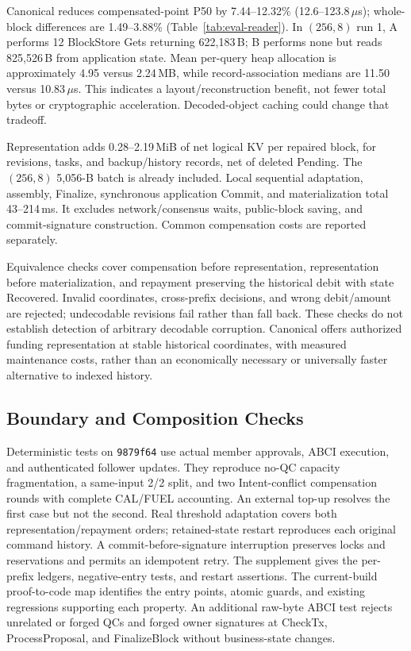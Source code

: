 Canonical reduces compensated-point P50 by 7.44--12.32\%
(12.6--123.8\,$\mu$s); whole-block differences are 1.49--3.88\%
(Table~\ref{tab:eval-reader}). In $(256,8)$ run 1, A performs 12
BlockStore Gets returning 622,183\,B; B performs none but reads
825,526\,B from application state. Mean per-query heap allocation is approximately
4.95 versus 2.24\,MB, while record-association medians are
11.50 versus 10.83\,$\mu$s. This indicates a layout/reconstruction
benefit, not fewer total bytes or cryptographic acceleration.
Decoded-object caching could change that tradeoff.

Representation adds 0.28--2.19\,MiB of net logical KV per repaired
block, for revisions, tasks, and backup/history records, net of deleted Pending. The $(256,8)$ 5,056-B batch is already
included. Local sequential adaptation, assembly, Finalize, synchronous
application Commit, and materialization total 43--214\,ms.
It excludes network/consensus waits, public-block saving, and
commit-signature construction. Common compensation costs are reported separately.



Equivalence checks cover compensation before representation,
representation before materialization, and repayment preserving the
historical debit with state Recovered. Invalid coordinates,
cross-prefix decisions, and wrong debit/amount are rejected;
undecodable revisions fail rather than fall back. These checks do
not establish detection of arbitrary decodable corruption.
Canonical offers authorized funding representation at stable
historical coordinates, with measured maintenance costs, rather
than an economically necessary or universally faster alternative
to indexed history.



\subsection{Boundary and Composition Checks}
\label{sec:eval-boundaries}
Deterministic tests on \texttt{9879f64} use actual member approvals,
ABCI execution, and authenticated follower updates. They reproduce
no-QC capacity fragmentation, a same-input 2/2 split, and two
Intent-conflict compensation rounds with complete CAL/FUEL accounting.
An external top-up resolves the first case but not the second. Real
threshold adaptation covers both representation/repayment orders;
retained-state restart reproduces each original command history.
A commit-before-signature interruption preserves locks and reservations
and permits an idempotent retry. The supplement gives the per-prefix
ledgers, negative-entry tests, and restart assertions. The current-build
proof-to-code map identifies the entry points, atomic guards, and existing
regressions supporting each property. An additional raw-byte ABCI test
rejects unrelated or forged QCs and forged owner signatures at CheckTx,
ProcessProposal, and FinalizeBlock without business-state changes.

